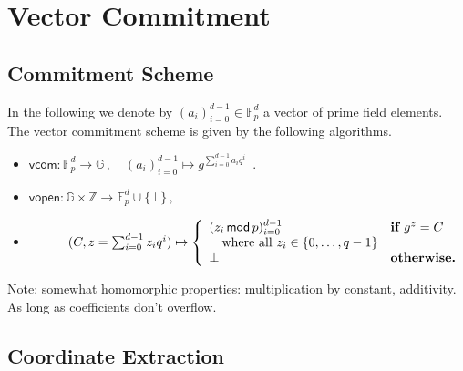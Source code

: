 \documentclass{article}
\begin{document}
\section{Vector Commitment}


\subsection{Commitment Scheme}

In the following we denote by $(a_i)_{i=0}^{d-1} \in \mathbb{F}_p^{d}$ a vector of prime field elements. The vector commitment scheme is given by the following algorithms.
\begin{itemize}
\item $\mathsf{vcom} : \mathbb{F}_p^d \rightarrow \mathbb{G} \, , \quad (a_i)_{i=0}^{d-1} \mapsto g^{\sum_{i=0}^{d-1} a_iq^i} \enspace .$
\item $\mathsf{vopen} : \mathbb{G} \times \mathbb{Z} \rightarrow \mathbb{F}_p^d \cup \{\bot\} \, , $
\item[] $\phantom{\mathsf{vopen} :} (C, z = \sum_{i=0}^{d-1} z_iq^i) \mapsto \left\lbrace \begin{array}{ll}
(z_i \, \mathsf{mod} \, p)_{i=0}^{d-1} & \textnormal{\bf if } g^z = C \\
\quad \textnormal{where all } z_i \in \{0,\ldots,q-1\} & \\
\bot & \textnormal{\bf otherwise.}
\end{array} \right.$ 
\end{itemize}

Note: somewhat homomorphic properties: multiplication by constant, additivity. As long as coefficients don't overflow.

\subsection{Coordinate Extraction}
\end{document}

